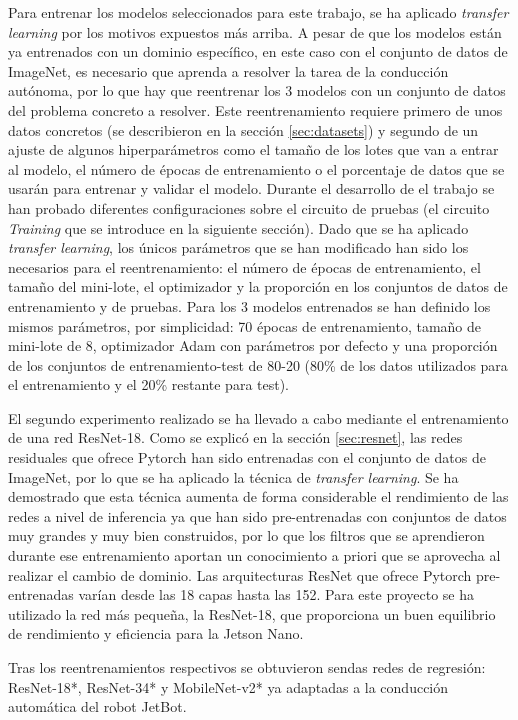 Para entrenar los modelos seleccionados para este trabajo, se ha aplicado \textit{transfer learning} por los motivos expuestos más arriba. A pesar de que los modelos están ya entrenados con un dominio específico, en este caso con el conjunto de datos de ImageNet, es necesario que aprenda a resolver la tarea de la conducción autónoma, por lo que hay que reentrenar los 3 modelos con un conjunto de datos del problema concreto a resolver. Este reentrenamiento requiere primero de unos datos concretos (se describieron en la sección \ref{sec:datasets}) y segundo de un ajuste de algunos hiperparámetros como el tamaño de los lotes que van a entrar al modelo, el número de épocas de entrenamiento o el porcentaje de datos que se usarán para entrenar y validar el modelo. Durante el desarrollo de el trabajo se han probado diferentes configuraciones sobre el circuito de pruebas (el circuito \textit{Training} que se introduce en la siguiente sección). Dado que se ha aplicado \textit{transfer learning}, los únicos parámetros que se han modificado han sido los necesarios para el reentrenamiento: el número de épocas de entrenamiento, el tamaño del mini-lote, el optimizador y la proporción en los conjuntos de datos de entrenamiento y de pruebas. Para los 3 modelos entrenados se han definido los mismos parámetros, por simplicidad: 70 épocas de entrenamiento, tamaño de mini-lote de 8, optimizador Adam con parámetros por defecto y una proporción de los conjuntos de entrenamiento-test de 80-20 (80\% de los datos utilizados para el entrenamiento y el 20\% restante para test).

El segundo experimento realizado se ha llevado a cabo mediante el entrenamiento de una red ResNet-18. Como se explicó en la sección \ref{sec:resnet}, las redes residuales que ofrece Pytorch han sido entrenadas con el conjunto de datos de ImageNet, por lo que se ha aplicado la técnica de \textit{transfer learning}. Se ha demostrado que esta técnica aumenta de forma considerable el rendimiento de las redes a nivel de inferencia ya que han sido pre-entrenadas con conjuntos de datos muy grandes y muy bien construidos, por lo que los filtros que se aprendieron durante ese entrenamiento aportan un conocimiento a priori que se aprovecha al realizar el cambio de dominio. Las arquitecturas ResNet que ofrece Pytorch pre-entrenadas varían desde las 18 capas hasta las 152. Para este proyecto se ha utilizado la red más pequeña, la ResNet-18, que proporciona un buen equilibrio de rendimiento y eficiencia para la Jetson Nano.

Tras los reentrenamientos respectivos se obtuvieron sendas redes de regresión: ResNet-18*, ResNet-34* y MobileNet-v2* ya adaptadas a la conducción automática del robot JetBot.


